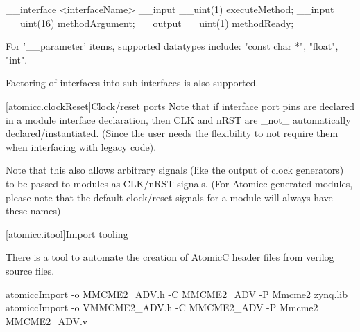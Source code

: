 \begin{bnf}
 \br
     \br
     \br
     \br
\end{bnf}

\begin{example}
\begin{codeblock}
     __interface <interfaceName> {
          __input __uint(1) executeMethod;
          __input __uint(16) methodArgument;
          __output __uint(1) methodReady;
     }
\end{codeblock}
\end{example}

For '__parameter' items, supported datatypes include: "const char *", "float", "int".

Factoring of interfaces into sub interfaces is also supported.

[atomicc.clockReset]{Clock/reset ports}
Note that if interface port pins are declared in a module interface declaration, then
CLK and nRST are _not_ automatically declared/instantiated.  (Since the user needs the
flexibility to not require them when interfacing with legacy code).

Note that this also allows arbitrary signals (like the output of clock generators) to be
passed to modules as CLK/nRST signals.  (For Atomicc generated modules, please note that the
default clock/reset signals for a module will always have these names)

[atomicc.itool]{Import tooling}

There is a tool to automate the creation of AtomicC header files from verilog source files.
\begin{example}
\begin{codeblock}
     atomiccImport -o MMCME2_ADV.h -C MMCME2_ADV -P Mmcme2 zynq.lib
     atomiccImport -o VMMCME2_ADV.h -C MMCME2_ADV -P Mmcme2 MMCME2_ADV.v
\end{codeblock}
\end{example}

